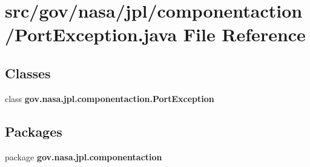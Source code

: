 \section{src/gov/nasa/jpl/componentaction/\+Port\+Exception.java File Reference}
\label{_port_exception_8java}
\subsection*{Classes}
\begin{DoxyCompactItemize}
\item 
class {\bf gov.\+nasa.\+jpl.\+componentaction.\+Port\+Exception}
\end{DoxyCompactItemize}
\subsection*{Packages}
\begin{DoxyCompactItemize}
\item 
package {\bf gov.\+nasa.\+jpl.\+componentaction}
\end{DoxyCompactItemize}
